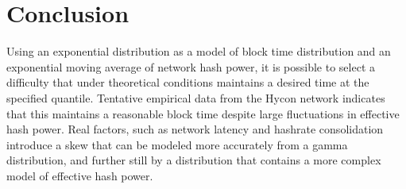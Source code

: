 \documentclass[]{article}
\begin{document}
\section{Conclusion}
Using an exponential distribution as a model of block time distribution and an exponential moving average of network hash power, it is possible to select a difficulty that under theoretical conditions maintains a desired time at the specified quantile.  Tentative empirical data from the Hycon network indicates that this maintains a reasonable block time despite large fluctuations in effective hash power.  Real factors, such as network latency and hashrate consolidation introduce a skew that can be modeled more accurately from a gamma distribution, and further still by a distribution that contains a more complex model of effective hash power. 



\end{document}
